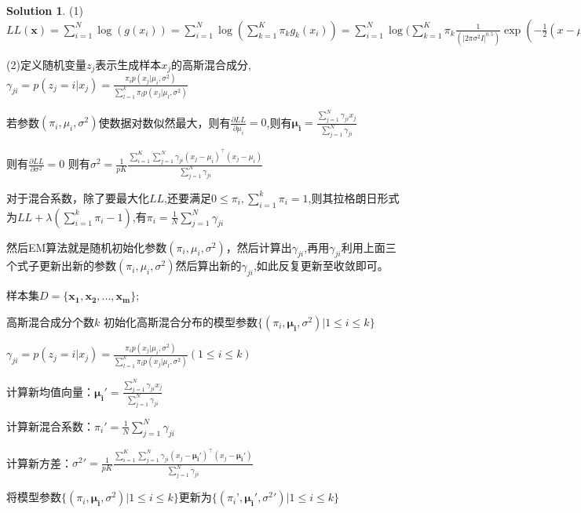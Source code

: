 \documentclass[a4paper,UTF8]{article}
\theoremstyle{definition}
\newtheorem*{solution}{Solution}
\begin{document}
\begin{solution}
	(1)$LL(\boldsymbol{x})=\sum_{i=1}^N \log(g(x_i))=\sum_{i=1}^N \log(\sum_{k=1}^K \pi_{k} g_{k}(x_i))=\sum_{i=1}^N \log(\sum_{k=1}^K \pi_{k} \frac{1}{(|2\pi\sigma^2 I|^{0.5})} \exp(-\frac{1}{2}(x-\mu_{k})^T(I \cdot \sigma^{-2})(x-\mu_{k}))$

	(2)定义随机变量$z_j$表示生成样本$x_j$的高斯混合成分,$\gamma_{ji}=p(z_j=i|x_j)=\frac{\pi_i p(x_j|\mu_i,\sigma^2)}{\sum_{l=1}^k \pi_l p(x_j|\mu_l,\sigma^2)}$

	若参数$(\pi_i,\mu_i,\sigma^2)$使数据对数似然最大，则有$\frac{\partial{LL}}{\partial \mu_i}=0$,则有$\mathbf{\mu_i}=\frac{\sum_{j=1}^N \gamma_{ji}x_j}{\sum_{j=1}^N{\gamma_{ji}}}$

	则有$\frac{\partial{LL}}{\partial \sigma^2}=0$ 则有$\sigma^2=\frac{1}{pK}\frac{\sum_{i=1}^K\sum_{j=1}^N\gamma_{ji}(x_j-\mu_i)^{\top}(x_j-\mu_i)}{\sum_{j=1}^N \gamma_{ji}}$

	对于混合系数，除了要最大化$LL$,还要满足$0 \leq \pi_i,\sum_{i=1}^k \pi_i=1$,则其拉格朗日形式为$LL+\lambda(\sum_{i=1}^k \pi_i-1)$,有$\pi_i=\frac{1}{N}\sum_{j=1}^N \gamma_{ji}$

	然后EM算法就是随机初始化参数$(\pi_i,\mu_i,\sigma^2)$，然后计算出$\gamma_{ji}$,再用$\gamma_{ji}$利用上面三个式子更新出新的参数$(\pi_i,\mu_i,\sigma^2)$然后算出新的$\gamma_{ji}$,如此反复更新至收敛即可。

	\begin{algorithm}[H]
	\caption{$EM$}
	\begin{algorithmic}[1]
	\Require 样本集$D=\{\mathbf{x_1},\mathbf{x_2},...,\mathbf{x_m}\}$;

				高斯混合成分个数$k$
	\State 初始化高斯混合分布的模型参数$\{(\pi_i,\mathbf{\mu_i},\sigma^2)|1\leq i \leq k\}$
	\Repeat

			\State $\gamma_{ji}=p(z_j=i|x_j)=\frac{\pi_i p(x_j|\mu_i,\sigma^2)}{\sum_{l=1}^k \pi_l p(x_j|\mu_l,\sigma^2)}(1\leq i \leq k)$
		\EndFor

			\State 计算新均值向量：$\mathbf{\mu_i}'=\frac{\sum_{j=1}^N \gamma_{ji}x_j}{\sum_{j=1}^N{\gamma_{ji}}}$

			
			\State 计算新混合系数：$\pi_i'=\frac{1}{N}\sum_{j=1}^N \gamma_{ji}$

		\EndFor

		\State 计算新方差：${\sigma^2}'=\frac{1}{pK}\frac{\sum_{i=1}^K\sum_{j=1}^N\gamma_{ji}(x_j-\mathbf{\mu_i}')^{\top}(x_j-\mathbf{\mu_i}')}{\sum_{j=1}^N \gamma_{ji}}$

		\State 将模型参数$\{(\pi_i,\mathbf{\mu_i},\sigma^2)|1\leq i \leq k\}$更新为$\{(\pi_i’,\mathbf{\mu_i}',{\sigma^2}')|1\leq i \leq k\}$



\end{algorithmic}
\end{algorithm}
\end{solution}
\end{document}
